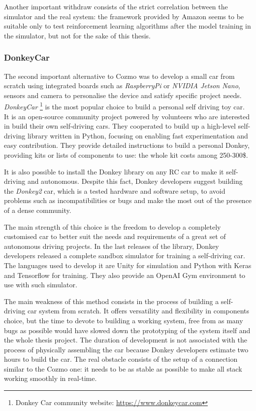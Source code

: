 Another important withdraw consists of the strict correlation between the simulator and the real system: the framework provided by Amazon seems to be suitable only to test reinforcement learning algorithms after the model training in the simulator, but not for the sake of this thesis.

\subsubsection{Donkey\textregistered Car}

The second important alternative to Cozmo was to develop a small car from scratch using integrated boards such as \textit{RaspberryPi} or \textit{NVIDIA Jetson Nano}, sensors and camera to personalise the device and satisfy specific project needs.
\textit{Donkey\textregistered Car} \footnote{Donkey Car community website: \href{https://www.donkeycar.com}{https://www.donkeycar.com}} is the most popular choice to build a personal self driving toy car. It is an open-source community project powered by volunteers who are interested in build their own self-driving cars. They cooperated to build up a high-level self-driving library written in Python, focusing on enabling fast experimentation and easy contribution. They provide detailed instructions to build a personal Donkey, providing kits or lists of components to use: the whole kit costs among 250-300\$.

It is also possible to install the Donkey library on any RC car to make it self-driving and autonomous. Despite this fact, Donkey developers suggest building the \textit{Donkey2} car, which is a tested hardware and software setup, to avoid problems such as incompatibilities or bugs and make the most out of the presence of a dense community.

The main strength of this choice is the freedom to develop a completely customised car to better suit the needs and requirements of a great set of autonomous driving projects. In the last releases of the library, Donkey developers released a complete sandbox simulator for training a self-driving car. The languages used to develop it are Unity for simulation and Python with Keras and Tensorflow for training. They also provide an OpenAI Gym environment to use with such simulator.

The main weakness of this method consists in the process of building a self-driving car system from scratch. It offers versatility and flexibility in components choice, but the time to devote to building a working system, free from as many bugs as possible would have slowed down the prototyping of the system itself and the whole thesis project. The duration of development is not associated with the process of physically assembling the car because Donkey developers estimate two hours to build the car. The real obstacle consists of the setup of a connection similar to the Cozmo one: it needs to be as stable as possible to make all stack working smoothly in real-time.

